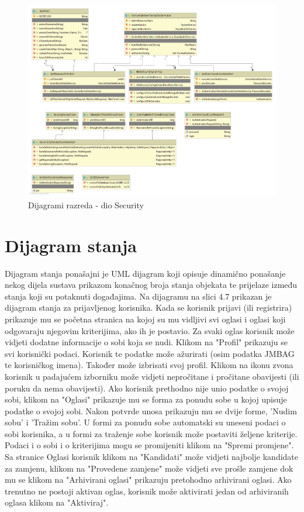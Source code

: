 			\begin{figure}[H]
				\includegraphics[scale=0.4]{dijagrami/classDiagramSecurity.png} %
				\centering
				\caption{Dijagrami razreda - dio Security}
				\label{fig:security}
			\end{figure}
		
		\eject
		
		\section{Dijagram stanja}
		
		
		Dijagram stanja ponašajni je UML dijagram koji opisuje dinamično ponašanje nekog dijela sustava prikazom konačnog broja stanja objekata te prijelaze između stanja koji su potaknuti događajima. Na dijagramu na slici 4.7 prikazan je dijagram stanja za prijavljenog korisnika. Kada se korisnik prijavi (ili registrira) prikazuje mu se početna stranica na kojoj su mu vidljivi svi oglasi i oglasi koji odgovaraju njegovim kriterijima, ako ih je postavio. Za svaki oglas korisnik može vidjeti dodatne informacije o sobi koja se nudi. Klikom na "Profil" prikazuju se svi korisnički podaci. Korisnik te podatke može ažurirati (osim podatka JMBAG te korisničkog imena). Također može izbrisati svoj profil. Klikom na ikonu zvona korisnik u padajućem izborniku može vidjeti nepročitane i pročitane obavijesti (ili poruku da nema obavijesti). Ako korisnik prethodno nije unio podatke o svojoj sobi, klikom na "Oglasi" prikazuje mu se forma za ponudu sobe u kojoj upisuje podatke o svojoj sobi. Nakon potvrde unosa prikazuju mu se dvije forme, 'Nudim sobu' i 'Tražim sobu'. U formi za ponudu sobe automatski su uneseni podaci o sobi korisnika, a u formi za traženje sobe korisnik može postaviti željene kriterije. Podaci i o sobi i o kriterijima mogu se promijeniti klikom na "Spremi promjene". Sa stranice Oglasi korisnik klikom na "Kandidati" može vidjeti najbolje kandidate za zamjenu, klikom na "Provedene zamjene" može vidjeti sve prošle  zamjene dok mu se klikom na "Arhivirani oglasi" prikazuju pretohodno arhivirani oglasi. Ako trenutno ne postoji aktivan oglas, korisnik može aktivirati jedan od arhiviranih oglasa klikom na "Aktiviraj". 
		
